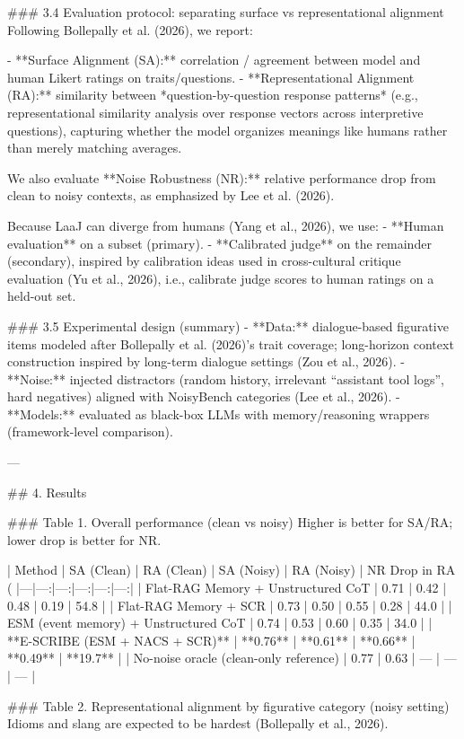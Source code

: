 ### 3.4 Evaluation protocol: separating surface vs representational alignment  
Following Bollepally et al. (2026), we report:

- **Surface Alignment (SA):** correlation / agreement between model and human Likert ratings on traits/questions.  
- **Representational Alignment (RA):** similarity between *question-by-question response patterns* (e.g., representational similarity analysis over response vectors across interpretive questions), capturing whether the model organizes meanings like humans rather than merely matching averages.

We also evaluate **Noise Robustness (NR):** relative performance drop from clean to noisy contexts, as emphasized by Lee et al. (2026).

Because LaaJ can diverge from humans (Yang et al., 2026), we use:
- **Human evaluation** on a subset (primary).  
- **Calibrated judge** on the remainder (secondary), inspired by calibration ideas used in cross-cultural critique evaluation (Yu et al., 2026), i.e., calibrate judge scores to human ratings on a held-out set.

### 3.5 Experimental design (summary)  
- **Data:** dialogue-based figurative items modeled after Bollepally et al. (2026)’s trait coverage; long-horizon context construction inspired by long-term dialogue settings (Zou et al., 2026).  
- **Noise:** injected distractors (random history, irrelevant “assistant tool logs”, hard negatives) aligned with NoisyBench categories (Lee et al., 2026).  
- **Models:** evaluated as black-box LLMs with memory/reasoning wrappers (framework-level comparison).

---

## 4. Results  

### Table 1. Overall performance (clean vs noisy)  
Higher is better for SA/RA; lower drop is better for NR.

| Method | SA (Clean) | RA (Clean) | SA (Noisy) | RA (Noisy) | NR Drop in RA (%
|---|---:|---:|---:|---:|---:|
| Flat-RAG Memory + Unstructured CoT | 0.71 | 0.42 | 0.48 | 0.19 | 54.8 |
| Flat-RAG Memory + SCR | 0.73 | 0.50 | 0.55 | 0.28 | 44.0 |
| ESM (event memory) + Unstructured CoT | 0.74 | 0.53 | 0.60 | 0.35 | 34.0 |
| **E-SCRIBE (ESM + NACS + SCR)** | **0.76** | **0.61** | **0.66** | **0.49** | **19.7** |
| No-noise oracle (clean-only reference) | 0.77 | 0.63 | — | — | — |

### Table 2. Representational alignment by figurative category (noisy setting)  
Idioms and slang are expected to be hardest (Bollepally et al., 2026).

